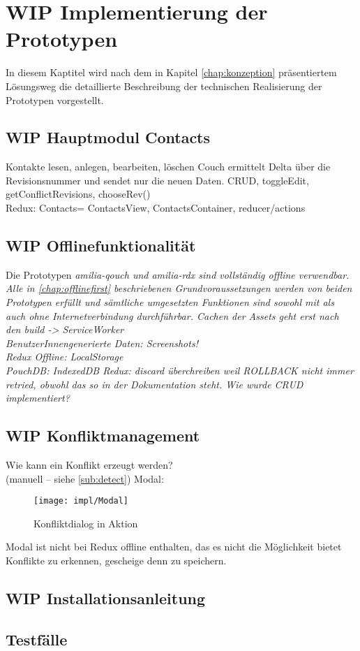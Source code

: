\chapter{\label{chap:implementierung}WIP Implementierung der Prototypen}
In diesem Kaptitel wird nach dem in Kapitel \ref{chap:konzeption} präsentiertem Lösungsweg die detaillierte Beschreibung der technischen Realisierung der Prototypen vorgestellt.\\
%
%
%
\section{WIP Hauptmodul Contacts}

Kontakte lesen, anlegen, bearbeiten, löschen
Couch ermittelt Delta über die Revisionsnummer und sendet nur die neuen Daten.
CRUD, toggleEdit, getConflictRevisions, chooseRev()\\
Redux: Contacts= ContactsView, ContactsContainer, reducer/actions
%
%
%
\section{WIP Offlinefunktionalität}
Die Prototypen \it{amilia-qouch} und \it{amilia-rdx} sind vollständig offline verwendbar.
Alle in \autoref{chap:offlinefirst} beschriebenen Grundvoraussetzungen werden von beiden Prototypen erfüllt und sämtliche umgesetzten Funktionen sind sowohl mit als auch ohne Internetverbindung durchführbar.
%
%
Cachen der Assets geht erst nach den build -> ServiceWorker\\
BenutzerInnengenerierte Daten:
Screenshots!\\
Redux Offline: LocalStorage\\
PouchDB: IndexedDB
%
%
Redux: discard überchreiben weil ROLLBACK nicht immer retried, obwohl das so in der Dokumentation steht.
Wie wurde CRUD implementiert?\\
%
%
%
\section{WIP Konfliktmanagement}
Wie kann ein Konflikt erzeugt werden?\\
(manuell -- siehe \ref{sub:detect})
Modal:
\begin{figure}[H]
  \centering
  \texttt{[image: impl/Modal]}
  \grayRule
  \caption{Konfliktdialog in Aktion}
  \label{fig:modal}
\end{figure}
Modal ist nicht bei Redux offline enthalten, das es nicht die Möglichkeit bietet Konflikte zu erkennen, gescheige denn zu speichern.
%
%
%
%
%
\section{WIP Installationsanleitung}


%
%
\section{\label{chap:impl:test}Testfälle}
